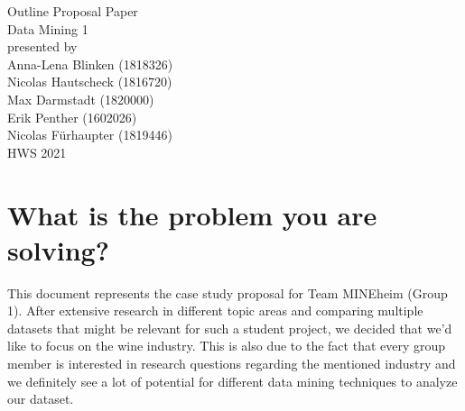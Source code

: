 \documentclass[11pt,titlepage,oneside,openany]{article}
\begin{document}
\begin{titlepage}
	\vspace*{2cm}
  \begin{center}
   {\Large Outline Proposal Paper\\}
   \vspace{2cm} 
   {Data Mining 1\\}
   \vspace{2cm}
   {presented by\\
    Anna-Lena Blinken (1818326)\\
	Nicolas Hautscheck (1816720)\\
	Max Darmstadt (1820000)\\
	Erik Penther (1602026)\\
	Nicolas Fürhaupter (1819446)\\
   }
   \vspace{1cm} 
   {HWS 2021}
  \end{center}
\end{titlepage} 

\tableofcontents
\newpage





\newpage



\section{What is the problem you are solving?}

This document represents the case study proposal for Team MINEheim (Group 1). After extensive research in different topic areas and comparing multiple datasets that might be relevant for such a student project, we decided that we’d like to focus on the wine industry. This is also due to the fact that every group member is interested in research questions regarding the mentioned industry and we definitely see a lot of potential for different data mining techniques to analyze our dataset. 
\end{document}
